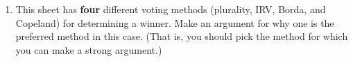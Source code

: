 \documentclass[12pt]{article}
\begin{document}
\begin{enumerate}
\begin{enumerate}
  \item This sheet has \textbf{four} different voting methods (plurality, IRV, Borda, and Copeland) for determining a winner. Make an argument for why one is the preferred method in this case. (That is, you should pick the method for which you can make a strong argument.)
\vspace{1in}
\end{enumerate}
%
%
%
%
%
%
%
%

\end{enumerate}
\end{document}
